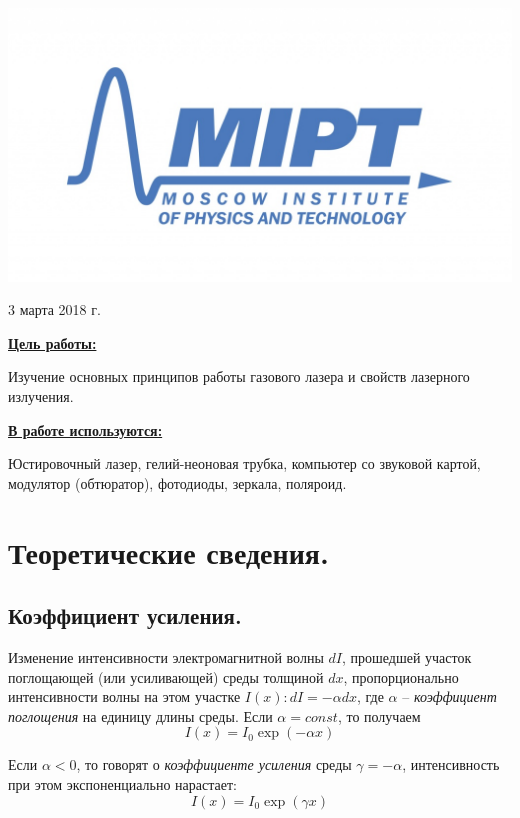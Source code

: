 \documentclass[a4paper, 12pt, twoside]{article}
\newenvironment{bottompar}{\par\vspace*{\fill}}{\clearpage}
\begin{document}
\begin{titlepage}
		\begin{bottompar}
			\begin{center}
				\includegraphics[width = 80 mm]{logo.jpg}
			\end{center}
			{\large 3 марта 2018 г.}
			
		\end{bottompar}
		\vfill %
		
	\end{titlepage}
	
	{\Large \uline { \textbf  {Цель работы:}}}
	
	\vspace{2mm}
	Изучение основных принципов работы газового лазера и свойств лазерного излучения.
	\vspace{\baselineskip}
	
	{\Large \uline { \textbf  {В работе используются:}}}
	
	\vspace{2mm}
	
	Юстировочный лазер, гелий-неоновая трубка, компьютер со звуковой картой, модулятор (обтюратор), фотодиоды, зеркала, поляроид.
	
	\section{Теоретические сведения.}
	
	\subsection{Коэффициент усиления.}
	Изменение интенсивности электромагнитной волны $dI$, прошедшей участок поглощающей (или усиливающей) среды толщиной $dx$, пропорционально интенсивности волны на этом участке $I(x): dI = - \alpha dx$, где $\alpha$ -- \textit{коэффициент поглощения} на единицу длины среды. Если $\alpha = const$, то получаем $$I(x) = I_0  \exp (-\alpha x)$$
	
	Если $\alpha < 0$, то говорят о \textit{коэффициенте усиления } среды $\gamma = - \alpha$, интенсивность при этом экспоненциально нарастает: $$I(x) = I_0  \exp (\gamma x)$$
	
\end{document}
